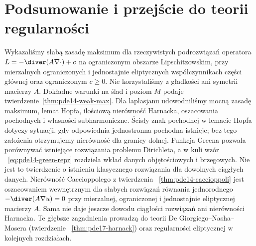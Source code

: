 \section{Podsumowanie i przejście do teorii regularności}
\label{sec:pde14-summary}
Wykazaliśmy słabą zasadę maksimum dla rzeczywistych
podrozwiązań operatora $L=-\diver(A\nabla\cdot)+c$
na ograniczonym obszarze Lipschitzowskim, przy mierzalnych
ograniczonych i jednostajnie eliptycznych współczynnikach
części głównej oraz ograniczonym $c\ge0$.
Nie korzystaliśmy z gładkości ani symetrii macierzy $A$.
Dokładne warunki na ślad i poziom $M$ podaje
twierdzenie~\ref{thm:pde14-weak-max}. Dla laplasjanu udowodniliśmy
mocną zasadę maksimum, lemat Hopfa, ilościową nierówność
Harnacka, oszacowania pochodnych i własności subharmoniczne.
Ścisły znak pochodnej w lemacie Hopfa dotyczy sytuacji,
gdy odpowiednia jednostronna pochodna istnieje;
bez tego założenia otrzymujemy nierówność dla granicy dolnej.
Funkcja Greena pozwala porównywać istniejące rozwiązania
problemu Dirichleta, a w kuli wzór
~\eqref{eq:pde14-green-repr} rozdziela wkład danych
objętościowych i brzegowych. Nie jest to twierdzenie
o istnieniu klasycznego rozwiązania dla dowolnych
ciągłych danych.
Nierówność Caccioppolego z twierdzenia
~\ref{thm:pde14-caccioppoli} jest oszacowaniem wewnętrznym
dla słabych rozwiązań równania jednorodnego
$-\diver(A\nabla u)=0$ przy mierzalnej, ograniczonej
i jednostajnie eliptycznej macierzy $A$. Sama nie daje
jeszcze dowodu ciągłości rozwiązań ani nierówności Harnacka. Te głębsze zagadnienia prowadzą do
teorii De Giorgiego--Nasha--Mosera (twierdzenie
~\ref{thm:pde17-harnack}) oraz regularności
eliptycznej w kolejnych rozdziałach.

